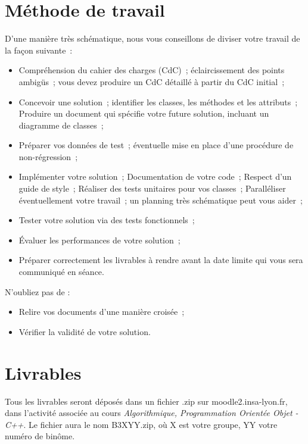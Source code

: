 \documentclass[oneside]{book}
\begin{document}
\section*{Méthode de travail}
D'une manière très schématique, nous vous conseillons de diviser votre travail de la façon suivante~:
\begin{itemize}
  \item Compréhension du cahier des charges (CdC)~; éclaircissement des points ambigüs~; vous devez produire un CdC détaillé à partir du CdC initial~;
  \item Concevoir une solution~; identifier les classes, les méthodes et les attributs~; Produire un document qui spécifie votre future solution, incluant un diagramme de classes~;
  \item Préparer vos données de test~; éventuelle mise en place d'une procédure de non-régression~;
  \item Implémenter votre solution~; Documentation de votre code~; Respect d'un guide de style~; Réaliser des tests unitaires pour vos classes~; Paralléliser éventuellement votre travail~; un planning très schématique peut vous aider~;
  \item Tester votre solution via des tests fonctionnels~;
  \item Évaluer les performances de votre solution~;
  \item Préparer correctement les livrables à rendre avant la date limite qui vous sera communiqué en séance.
\end{itemize}

N'oubliez pas de :
\begin{itemize}
  \item Relire vos documents d'une manière croisée~;
  \item Vérifier la validité de votre solution.
\end{itemize}

\section*{Livrables}
Tous les livrables seront déposés dans un fichier .zip sur moodle2.insa-lyon.fr, dans l'activité associée au cours \textit{Algorithmique, Programmation Orientée Objet - C++}. Le fichier aura le nom B3XYY.zip, où X est votre groupe, YY votre numéro de binôme.
\end{document}
